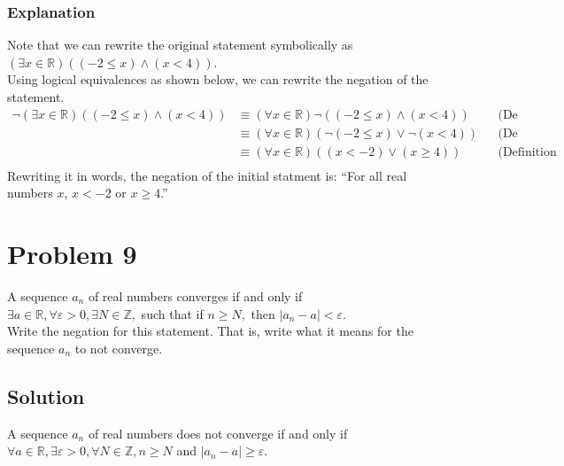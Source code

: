 \documentclass[table]{article}
\begin{document}
\subsubsection{Explanation}
Note that we can rewrite the original statement symbolically as $(\exists x \in \mathbb{R})((-2 \leq x) \land (x < 4))$.\\
Using logical equivalences as shown below, we can rewrite the negation of the statement.\\
\begin{align*}
\neg (\exists x \in \mathbb{R})((-2 \leq x) \land (x < 4))
&\equiv (\forall x \in \mathbb{R})\neg((-2 \leq x) \land (x < 4)) && \text{(De Morgan's Law of Quantifiers)}\\
&\equiv (\forall x \in \mathbb{R})(\neg(-2 \leq x) \lor \neg(x < 4)) && \text{(De Morgan's Law of Propositional Logic)}\\
&\equiv (\forall x \in \mathbb{R})((x < -2) \lor (x \geq 4)) && \text{(Definition of Inequalities)}\\
\end{align*}
Rewriting it in words, the negation of the initial statment is: ``For all real numbers $x$, $x < -2$ or $x \geq 4$.''
\section{Problem 9}
A sequence $a_n$ of real numbers converges if and only if\\
$\exists a \in \mathbb{R}, \forall \varepsilon > 0, \exists N \in \mathbb{Z},$ such that if $n \geq N,$ then $|a_n - a| < \varepsilon$.\\
Write the negation for this statement. That is, write what it means for the sequence $a_n$ to not converge.
\subsection{Solution}
A sequence $a_n$ of real numbers does not converge if and only if\\
$\forall a \in \mathbb{R}, \exists \varepsilon > 0, \forall N \in \mathbb{Z}, n \geq N$ and $|a_n - a| \geq \varepsilon$.
\end{document}
